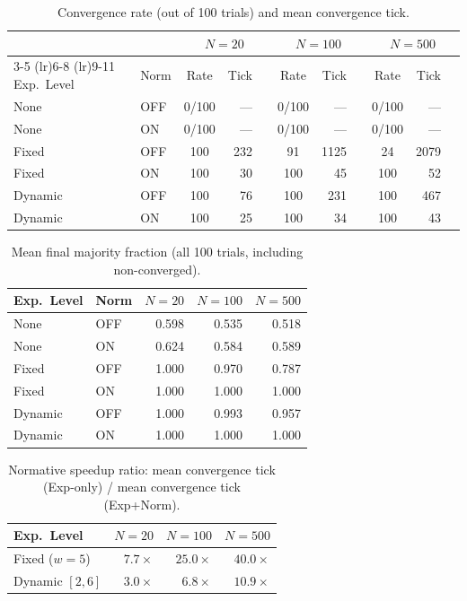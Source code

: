 \documentclass[11pt,a4paper]{article}
\begin{document}
\begin{table}[H]
\centering
\caption{Convergence rate (out of 100 trials) and mean convergence tick.}
\label{tab:ablation}
\begin{tabular}{@{}ll crc crc crc@{}}
\toprule
& & \multicolumn{3}{c}{$N = 20$} & \multicolumn{3}{c}{$N = 100$} & \multicolumn{3}{c}{$N = 500$} \\
\cmidrule(lr){3-5} \cmidrule(lr){6-8} \cmidrule(lr){9-11}
Exp.\ Level & Norm & Rate & Tick & & Rate & Tick & & Rate & Tick & \\
\midrule
None    & OFF & 0/100  & ---   && 0/100  & ---    && 0/100  & ---    \\
None    & ON  & 0/100  & ---   && 0/100  & ---    && 0/100  & ---    \\
\addlinespace
Fixed   & OFF & 100 & 232  && 91 & 1125   && 24 & 2079   \\
Fixed   & ON  & 100 & 30   && 100 & 45    && 100 & 52    \\
\addlinespace
Dynamic & OFF & 100 & 76   && 100 & 231   && 100 & 467   \\
Dynamic & ON  & 100 & 25   && 100 & 34    && 100 & 43    \\
\bottomrule
\end{tabular}
\end{table}

\begin{table}[H]
\centering
\caption{Mean final majority fraction (all 100 trials, including non-converged).}
\label{tab:majority}
\begin{tabular}{@{}ll rrr@{}}
\toprule
Exp.\ Level & Norm & $N=20$ & $N=100$ & $N=500$ \\
\midrule
None  & OFF & 0.598 & 0.535 & 0.518 \\
None  & ON  & 0.624 & 0.584 & 0.589 \\
Fixed & OFF & 1.000 & 0.970 & 0.787 \\
Fixed & ON  & 1.000 & 1.000 & 1.000 \\
Dynamic & OFF & 1.000 & 0.993 & 0.957 \\
Dynamic & ON  & 1.000 & 1.000 & 1.000 \\
\bottomrule
\end{tabular}
\end{table}

\begin{table}[H]
\centering
\caption{Normative speedup ratio: mean convergence tick (Exp-only) / mean convergence tick (Exp+Norm).}
\label{tab:speedup}
\begin{tabular}{@{}l rrr@{}}
\toprule
Exp.\ Level & $N = 20$ & $N = 100$ & $N = 500$ \\
\midrule
Fixed ($w{=}5$) & $7.7\times$ & $25.0\times$ & $40.0\times$ \\
Dynamic $[2,6]$ & $3.0\times$ & $6.8\times$ & $10.9\times$ \\
\bottomrule
\end{tabular}
\end{table}
\end{document}

